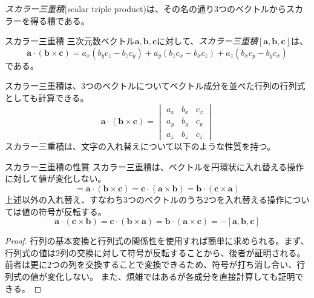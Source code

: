 \emph{スカラー三重積}(scalar triple product)は、その名の通り3つのベクトルからスカラーを得る積である。
\begin{definition*}{スカラー三重積}
	三次元数ベクトル\(\boldsymbol{a},\boldsymbol{b},\boldsymbol{c}\)に対して、\emph{スカラー三重積}\([\boldsymbol{a},\boldsymbol{b},\boldsymbol{c}]\)は、
	\begin{equation}
		\boldsymbol{a}\cdot(\boldsymbol{b}\times\boldsymbol{c})= a_x (b_y c_z - b_z c_y)+ a_y (b_z c_x - b_x c_z)+a_z (b_x c_y - b_y c_x)
	\end{equation}
	である。
\end{definition*}
スカラー三重積は、3つのベクトルについてベクトル成分を並べた行列の行列式としても計算できる。
\begin{equation}
	\boldsymbol{a}\cdot(\boldsymbol{b}\times\boldsymbol{c})=
	\begin{vmatrix}
		a_x & b_x & c_x \\
		a_y & b_y & c_y \\
		a_z & b_z & c_z
	\end{vmatrix}
\end{equation}
スカラー三重積は、文字の入れ替えについて以下のような性質を持つ。
\begin{theorem*}{スカラー三重積の性質}
	スカラー三重積は、ベクトルを円環状に入れ替える操作に対して値が変化しない。
	\begin{equation}
		[\boldsymbol{a},\boldsymbol{b},\boldsymbol{c}]= \boldsymbol{a}\cdot(\boldsymbol{b}\times\boldsymbol{c})
		=\boldsymbol{c}\cdot(\boldsymbol{a}\times\boldsymbol{b})
		=\boldsymbol{b}\cdot(\boldsymbol{c}\times\boldsymbol{a})
	\end{equation}
	上述以外の入れ替え、すなわち3つのベクトルのうち2つを入れ替える操作については値の符号が反転する。
	\begin{equation}
		\boldsymbol{a}\cdot(\boldsymbol{c}\times\boldsymbol{b})
		=\boldsymbol{c}\cdot(\boldsymbol{b}\times\boldsymbol{a})
		=\boldsymbol{b}\cdot(\boldsymbol{a}\times\boldsymbol{c})  =- [\boldsymbol{a},\boldsymbol{b},\boldsymbol{c}]
	\end{equation}
\end{theorem*}
\begin{proof}
	行列の基本変換と行列式の関係性を使用すれば簡単に求められる。まず、行列式の値は2列の交換に対して符号が反転することから、後者が証明される。前者は更に2つの列を交換することで変換できるため、符号が打ち消し合い、行列式の値が変化しない。
	また、煩雑ではあるが各成分を直接計算しても証明できる。
\end{proof}

